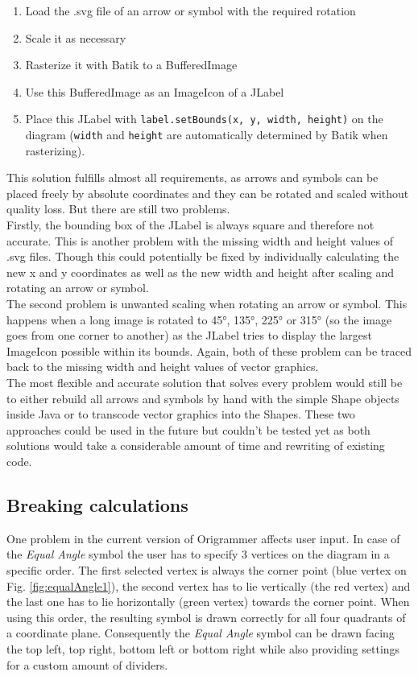 \begin{enumerate}[label=\textbf{\arabic*}.]
	\item Load the .svg file of an arrow or symbol with the required rotation
	\item Scale it as necessary
	\item Rasterize it with Batik to a BufferedImage
	\item Use this BufferedImage as an ImageIcon of a JLabel
	\item Place this JLabel with \texttt{label.setBounds(x, y, width, height)}  on the diagram (\texttt{width} and \texttt{height} are automatically determined by Batik when rasterizing).
\end{enumerate}

This solution fulfills almost all requirements, as arrows and symbols can be placed freely by absolute coordinates and they can be rotated and scaled without quality loss. But there are still two problems.\\
Firstly, the bounding box of the JLabel is always square and therefore not accurate. This is another problem with the missing width and height values of .svg files. Though this could potentially be fixed by individually calculating the new x and y coordinates as well as the new width and height after scaling and rotating an arrow or symbol.\\
The second problem is unwanted scaling when rotating an arrow or symbol. This happens when a long image is rotated to 45°, 135°, 225° or 315° (so the image goes from one corner to another) as the JLabel tries to display the largest ImageIcon possible within its bounds. Again, both of these problem can be traced back to the missing width and height values of vector graphics.\\
The most flexible and accurate solution that solves every problem would still be to either rebuild all arrows and symbols by hand with the simple Shape objects inside Java or to transcode vector graphics into the Shapes. These two approaches could be used in the future but couldn't be tested yet as both solutions would take a considerable amount of time and rewriting of existing code.

\subsection{Breaking calculations}
\label{sec:breakingCalc}
One problem in the current version of Origrammer affects user input. In case of the \emph{Equal Angle} symbol the user has to specify 3 vertices on the diagram in a specific order. The first selected vertex is always the corner point (blue vertex on Fig. \ref{fig:equalAngle1}), the second vertex has to lie vertically (the red vertex) and the last one has to lie horizontally (green vertex) towards the corner point. When using this order, the resulting symbol is drawn correctly for all four quadrants of a coordinate plane. Consequently the \emph{Equal Angle} symbol can be drawn facing the top left, top right, bottom left or bottom right while also providing settings for a custom amount of dividers.


